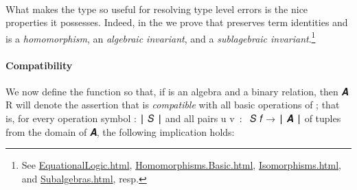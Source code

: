 \begin{code}
\\
%
\>[1]\AgdaSpace{}%
\AgdaSpace{}%
\AgdaSpace{}%
\AgdaSymbol{=}\AgdaSpace{}%
\AgdaSpace{}%
\AgdaSymbol{(}\AgdaSpace{}%
\AgdaSymbol{(}\AgdaSpace{}%
\AgdaSymbol{))}\AgdaSpace{}%
\AgdaSpace{}%
\AgdaSymbol{(}\AgdaSpace{}%
\AgdaSymbol{:}\AgdaSpace{}%
\AgdaSpace{}%
\AgdaSpace{}%
\AgdaSymbol{)}\AgdaSpace{}%
\AgdaSpace{}%
\AgdaSpace{}%
\AgdaSymbol{((}\AgdaSpace{}%
\AgdaSymbol{)}\AgdaSpace{}%
\AgdaSymbol{)}\AgdaSpace{}%
\AgdaSymbol{)}\<%
\end{code}
\ccpad
What makes the  type so useful for resolving type level errors is the nice properties it possesses. Indeed, in the \ualib we prove that  preserves term identities and is a \emph{homomorphism}, an \emph{algebraic invariant}, and a \emph{sublagebraic invariant}.\footnote{%
See \href{https://ualib.gitlab.io/Varieties.EquationalLogic.html\#lift-invariance}{EquationalLogic.html}, \href{https://ualib.gitlab.io/Homomorphisms.Basic.html\#exmples-of-homomorphisms}{Homomorphisms.Basic.html}, \href{https://ualib.gitlab.io/Homomorphisms.Isomorphisms.html\#lift-is-an-algebraic-invariant}{Isomorphisms.html}, and \href{https://ualib.gitlab.io/Subalgebras.Subalgebras.html\#lifts-of-subalgebras}{Subalgebras.html}, resp.}






\paragraph*{Compatibility}\label{compatibility-of-binary-relations}

We now define the function  so that, if  is an algebra and  a binary relation, then  \ab 𝑨 \ab R will denote the assertion that  is \emph{compatible} with all basic operations of ; that is, for every operation symbol  \as : \af ∣ \ab 𝑆 \af ∣ and all pairs \ab u \ab v~\as :~ \ab 𝑆  \ab 𝑓 \as → \af ∣ \ab 𝑨 \af ∣ of tuples from the domain of \ab 𝑨, the following implication holds:\\[-8pt]

